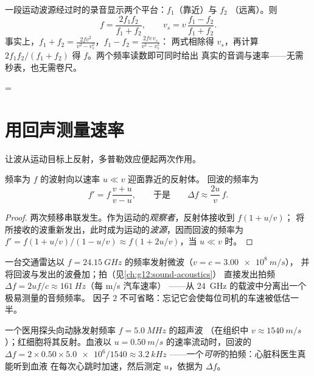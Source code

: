 \begin{method}[读取经过数据]\label{met:g12:doppler-effect:pass}
一段运动波源经过时的录音显示两个平台：$f_1$（靠近）与 $f_2$
（远离）。则
\[
f = \frac{2 f_1 f_2}{f_1 + f_2}, \qquad
v_s = v\,\frac{f_1 - f_2}{f_1 + f_2}.
\]
事实上，$f_1 + f_2 = \frac{2fv^2}{v^2 - v_s^2}$，$f_1 - f_2 = \frac{2fv\,v_s}{v^2 - v_s^2}$：
两式相除得 $v_s$，再计算 $2f_1 f_2/(f_1 + f_2)$ 得 $f$。两个频率读数即可同时给出
真实的音调与速率——无需秒表，也无需卷尺。
\end{method}

=\section{用回声测量速率}

让波从运动目标上反射，多普勒效应便起两次作用。

\begin{proposition}[反射使频移加倍]\label{prop:g12:doppler-effect:double}
频率为 $f$ 的波射向以速率 $u \ll v$ 迎面靠近的反射体。
回波的频率为
\[ f' = f\,\frac{v + u}{v - u}, \qquad \text{于是} \qquad \Delta f \approx \frac{2u}{v}\,f . \]
\end{proposition}

\begin{proof}
两次频移串联发生。作为运动的\emph{观察者}，反射体接收到 $f(1 + u/v)$；
将所接收的波重新发出，此时成为运动的\emph{波源}，因而回波的频率为
$f' = f(1 + u/v)/(1 - u/v) \approx f(1 + 2u/v)$，当 $u \ll v$ 时。
\end{proof}

\begin{example}[雷达测速枪]\label{ex:g12:doppler-effect:radar}
一台交通雷达以 $f = \qty{24.15}{GHz}$ 的频率发射微波（$v = c = \qty{3.00e8}{m/s}$），
并将回波与发出的波叠加；拍（见\cref{ch:g12:sound-acoustics}）
直接发出拍频 $\Delta f = 2uf/c \approx \qty{161}{Hz}$（每 \unit{m/s} 汽车速率）
——从 \qty{24}{GHz} 的载波中分离出一个极易测量的音频频率。
因子 $2$ 不可省略：忘记它会使每位司机的车速被低估一半。
\end{example}

\begin{example}[多普勒超声]\label{ex:g12:doppler-effect:ultrasound}
一个医用探头向动脉发射频率 $f = \qty{5.0}{MHz}$ 的超声波
（在组织中 $v \approx \qty{1540}{m/s}$）；红细胞将其反射。血液以
$u = \qty{0.50}{m/s}$ 的速率流动时，回波的 $\Delta f = 2 \times 0.50 \times \num{5.0e6}/1540 \approx
\qty{3.2}{kHz}$ ——一个\emph{可听}的拍频：心脏科医生真能听到血液
在每次心跳时加速，然后测定 $u$，依据为 $\Delta f$。
\end{example}

